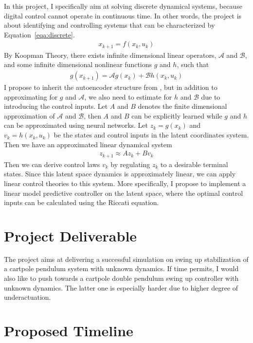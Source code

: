 \documentclass[12pt]{article}
\begin{document}
In this project, I specifically aim at solving discrete dynamical systems, because digital control
cannot operate in continuous time. In other words, the project is about identifying
and controlling systems that can be characterized by Equation~\ref{eqa:discrete}.
\begin{gather}\label{eqa:discrete}
  x_{k+1} = f(x_k, u_k)
\end{gather}
By Koopman Theory, there exists infinite dimensional linear operators, $\mathcal{A}$ and
$\mathcal{B}$, and some infinite dimensional nonlinear functions $g$ and $h$, such that
\begin{gather}
  g(x_{k+1}) = \mathcal{A} g(x_k) + \mathcal{B} h(x_k, u_k)
\end{gather}
I propose to inherit the autoencoder structure from \cite{lusch2018deep}, but in addition
to approximating for $g$ and $\mathcal{A}$, we also need to estimate for $h$ and $\mathcal{B}$
due to introducing the control inputs. Let $A$ and $B$ denotes the finite dimensional
approximation of $\mathcal{A}$ and $\mathcal{B}$, then $A$ and $B$ can be explicitly learned
while $g$ and $h$ can be approximated using neural networks. Let $z_k = g(x_k)$ and
$v_k = h(x_k, u_k)$ be the states and control inputs in the latent coordinates system. Then
we have an approximated linear dynamical system
\begin{gather}
  z_{k+1} \approx A z_k + B v_k
\end{gather}
Then we can derive control laws $v_k$ by regulating $z_k$ to a desirable terminal states.
Since this latent space dynamics is approximately linear, we can apply linear control
theories to this system. More specifically, I propose to implement a linear
model predictive controller on the latent space, where the optimal control inputs
can be calculated using the Riccati equation.

\section{Project Deliverable}
The project aims at delivering a successful simulation on swing up stabilization of a cartpole
pendulum system with unknown dynamics. If time permits, I would also like to push towards
a cartpole double pendulum swing up controller with unknown dynamics. The latter one is
especially harder due to higher degree of underactuation.

\section{Proposed Timeline}
\end{document}
